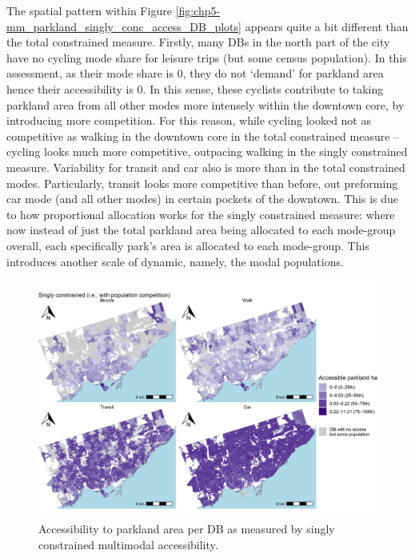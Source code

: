 \documentclass[
11pt, %
oneside, %
english, %
singlespacing, %
]{macthesis} %
\begin{document}
The spatial pattern within Figure \ref{fig:chp5-mm_parkland_singly_conc_access_DB_plots} appears quite a bit different than the total constrained measure. Firstly, many DBs in the north part of the city have no cycling mode share for leisure trips (but some census population). In this assessment, as their mode share is 0, they do not `demand' for parkland area hence their accessibility is 0. In this sense, these cyclists contribute to taking parkland area from all other modes more intensely within the downtown core, by introducing more competition. For this reason, while cycling looked not as competitive as walking in the downtown core in the total constrained measure -- cycling looks much more competitive, outpacing walking in the singly constrained measure. Variability for transit and car also is more than in the total constrained modes. Particularly, transit looks more competitive than before, out preforming car mode (and all other modes) in certain pockets of the downtown. This is due to how proportional allocation works for the singly constrained measure: where now instead of just the total parkland area being allocated to each mode-group overall, each specifically park's area is allocated to each mode-group. This introduces another scale of dynamic, namely, the modal populations.

\begin{figure}

{\centering \includegraphics[width=6in]{./data/figures/chp5-mm_parkland_singly_conc_access_DB_plots} 

}

\caption{\label{fig:chp5-mm_parkland_singly_conc_access_DB_plots}Accessibility to parkland area per DB as measured by singly constrained multimodal accessibility.}\label{fig:unnamed-chunk-78}
\end{figure}
\end{document}
